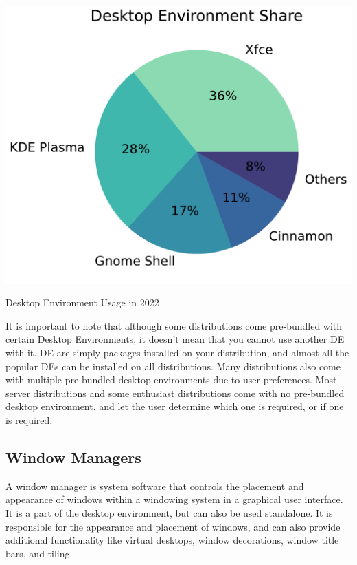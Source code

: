 \begin{marginfigure}
	\includegraphics{images/pdf/de-chart.pdf}
	\caption[Desktop Environment Usage]{Desktop Environment Usage in 2022}
\end{marginfigure}

It is important to note that although some distributions come pre-bundled with certain Desktop Environments, it doesn't mean that you cannot use another DE with it. DE are simply packages installed on your distribution, and almost all the popular DEs can be installed on all distributions. Many distributions also come with multiple pre-bundled desktop environments due to user preferences. Most server distributions and some enthusiast distributions come with no pre-bundled desktop environment, and let the user determine which one is required, or if one is required.

\subsection{Window Managers}

\begin{definition}
  A window manager is system software that controls the placement and appearance of windows within a windowing system in a graphical user interface. It is a part of the desktop environment, but can also be used standalone. It is responsible for the appearance and placement of windows, and can also provide additional functionality like virtual desktops, window decorations, window title bars, and tiling.
\end{definition}

